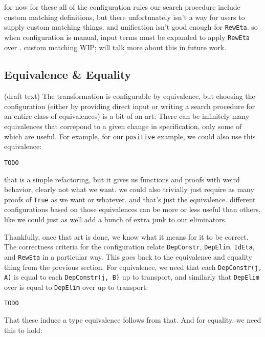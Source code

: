 for now for these all of the configuration rules our search procedure include custom matching definitions,
but there unfortunately isn't a way for users to supply custom matching things,
and unification isn't good enough for \lstinline{RewEta}.
so when configuration is manual, input terms must be expanded to apply \lstinline{RewEta} over \A.
custom matching WIP; will talk more about this in future work.

\subsection{Equivalence \& Equality}
\label{sec:art}

(draft text) The transformation is configurable by equivalence, but choosing the configuration (either by providing direct input or writing a 
search procedure for an entire class of equivalences) is a bit of an art: There can be infinitely many equivalences that correpond to a 
given change in specification, only some of which are useful.
For example, for our \lstinline{positive} example, we could also use this equivalence:

\begin{lstlisting}
TODO
\end{lstlisting}
that is a simple refactoring, but it gives us functions and proofs with weird behavior, clearly not what we want.
we could also trivially just require as many proofs of \lstinline{True} as we want or whatever.
and that's just the equivalence.
different configurations based on those equivalences
can be more or less useful than others, %
like we could just as well add a bunch of extra junk to our eliminators.

Thankfully, once that art is done, we know what it means for it to be correct.
The correctness criteria for the configuration relate \lstinline{DepConstr}, \lstinline{DepElim}, \lstinline{IdEta}, and \lstinline{RewEta}
in a particular way.
This goes back to the equivalence and equality thing from the previous section.
For equivalence, we need that each \lstinline{DepConstr(j, A)} is equal to each \lstinline{DepConstr(j, B)} up to transport,
and similarly that \lstinline{DepElim} over \A is equal to \lstinline{DepElim} over \B up to transport:

\begin{lstlisting}
TODO
\end{lstlisting}
That these induce a type equivalence follows from that.
And for equality, we need this to hold:

